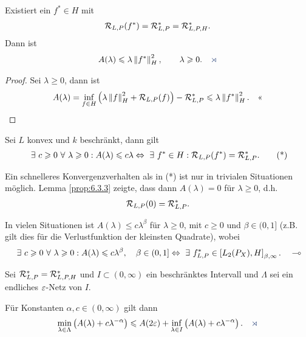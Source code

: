 \begin{prop}
\label{prop:6.3.4}
Existiert ein $f^*\in H$ mit
\begin{align*}
\mathcal{R}_{L,P}(f^*) = \mathcal{R}_{L,P}^* = \mathcal{R}_{L,P,H}^*.
\end{align*}
Dann ist
\begin{align*}
A(\lambda) \le \lambda\norm{f^*}_H^2,\qquad \lambda \ge 0.\fishhere
\end{align*}
\end{prop}
\begin{proof}
Sei $\lambda \ge 0$, dann ist
\begin{align*}
A(\lambda) = \inf_{f\in H} \left( \lambda\left\|f\right\|_H^2 + \mathcal{R}_{L,P}(f) \right) -
\mathcal{R}_{L,P}^* \leqslant \lambda\left\|f^*\right\|_H^2.\quad\text{<<}
\end{align*}
\end{proof}

\begin{bem*}[Bemerkungen.]
\begin{bemenum}
\item Sei $L$ konvex und $k$ beschränkt, dann gilt
\begin{align*}
\exists c\ge 0 \forall \lambda \ge 0 : A(\lambda) \le c\lambda
\Leftrightarrow
\exists f^*\in H : \RR_{L,P}(f^*) = \RR_{L,P}^*.\tag{*}
\end{align*}
\item Ein schnelleres Konvergenzverhalten als in (*) ist nur in trivialen
Situationen möglich. Lemma \ref{prop:6.3.3} zeigte, dass dann $A(\lambda)=0$ für
$\lambda \ge 0$, d.h.
\begin{align*}
\mathcal{R}_{L,P}(0) = \mathcal{R}_{L,P}^*.
\end{align*}
\item In vielen Situationen ist $A(\lambda)\le c\lambda^\beta$ für $\lambda \ge
0$, mit $c\ge 0$ und $\beta\in(0,1]$ (z.B. gilt dies für die Verlustfunktion
der kleinsten Quadrate), wobei
\begin{align*}
\exists c\ge 0 \forall \lambda \ge 0 : A(\lambda)\le c\lambda^\beta,\quad
\beta\in(0,1] \Leftrightarrow
\exists f_{L,P}^* \in \left[L_2(P_X),H \right]_{\beta,\infty}.\maphere
\end{align*}
\end{bemenum}
\end{bem*}

\begin{lem}
\label{prop:6.3.5}
Sei $\mathcal{R}_{L,P}^*= \mathcal{R}_{L,P,H}^*$ und $I\subset (0,\infty)$ ein beschränktes
Intervall und $\Lambda$ sei ein endliches $\varepsilon$-Netz von $I$.

Für Konstanten $\alpha,c\in (0,\infty)$ gilt dann
\begin{align*}
\min_{\lambda\in\Lambda} \left(A(\lambda) + c\lambda^{-\alpha} \right)
\le A(2\ep) + \inf_{\lambda\in I} \left(A(\lambda) + c\lambda^{-\alpha}
\right).\fishhere
\end{align*}
\end{lem}

